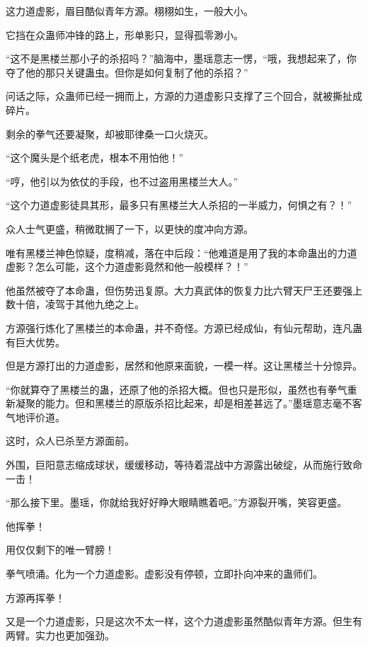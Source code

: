 
\begin{this_body}



这力道虚影，眉目酷似青年方源。栩栩如生，一般大小。

它挡在众蛊师冲锋的路上，形单影只，显得孤零渺小。

“这不是黑楼兰那小子的杀招吗？”脑海中，墨瑶意志一愣，“哦，我想起来了，你夺了他的那只关键蛊虫。但你是如何复制了他的杀招？”

问话之际，众蛊师已经一拥而上，方源的力道虚影只支撑了三个回合，就被撕扯成碎片。

剩余的拳气还要凝聚，却被耶律桑一口火烧灭。

“这个魔头是个纸老虎，根本不用怕他！”

“哼，他引以为依仗的手段，也不过盗用黑楼兰大人。”

“这个力道虚影徒具其形，最多只有黑楼兰大人杀招的一半威力，何惧之有？！”

众人士气更盛，稍微耽搁了一下，以更快的度冲向方源。

唯有黑楼兰神色惊疑，度稍减，落在中后段：“他难道是用了我的本命蛊出的力道虚影？怎么可能，这个力道虚影竟然和他一般模样？！”

他虽然被夺了本命蛊，但伤势迅复原。大力真武体的恢复力比六臂天尸王还要强上数十倍，凌驾于其他九绝之上。

方源强行炼化了黑楼兰的本命蛊，并不奇怪。方源已经成仙，有仙元帮助，连凡蛊有巨大优势。

但是方源打出的力道虚影，居然和他原来面貌，一模一样。这让黑楼兰十分惊异。

“你就算夺了黑楼兰的蛊，还原了他的杀招大概。但也只是形似，虽然也有拳气重新凝聚的能力。但和黑楼兰的原版杀招比起来，却是相差甚远了。”墨瑶意志毫不客气地评价道。

这时，众人已杀至方源面前。

外围，巨阳意志缩成球状，缓缓移动，等待着混战中方源露出破绽，从而施行致命一击！

“那么接下里。墨瑶，你就给我好好睁大眼睛瞧着吧。”方源裂开嘴，笑容更盛。

他挥拳！

用仅仅剩下的唯一臂膀！

拳气喷涌。化为一个力道虚影。虚影没有停顿，立即扑向冲来的蛊师们。

方源再挥拳！

又是一个力道虚影，只是这次不太一样，这个力道虚影虽然酷似青年方源。但生有两臂。实力也更加强劲。


\end{this_body}
